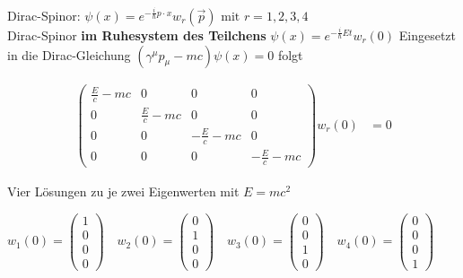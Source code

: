 




{\Huge
Dirac-Spinor: \( \psi(x) = e^{-\frac{i}{\hbar}p\cdot x}w_r(\vec p) \text{ mit }  r=1,2,3,4 \)\\
Dirac-Spinor \textbf{im Ruhesystem des Teilchens} \( \psi(x) = e^{-\frac{i}{\hbar}Et  }w_r(0) \)
Eingesetzt in die Dirac-Gleichung \( \left(\gamma^\mu p_\mu - mc\right)\psi(x) = 0 \) folgt

\begin{align*}
   \begin{pmatrix}
    \frac{E}{c} - mc&0&0&0\\
    0&\frac{E}{c} - mc&0&0\\ 
    0&0&-\frac{E}{c} - mc&0\\
    0&0&0&-\frac{E}{c} - mc
  \end{pmatrix} w_r(0) &=0
\end{align*}

Vier Lösungen zu je zwei Eigenwerten mit \(E=mc^2\)

\(
   w_1(0) =
  \begin{pmatrix}
    1\\0\\0\\0
  \end{pmatrix}\quad  
  w_2(0) =
  \begin{pmatrix}
    0\\1\\0\\0
  \end{pmatrix}\quad  
 w_3(0) =
  \begin{pmatrix}
    0\\0\\1\\0
  \end{pmatrix}\quad  
 w_4(0) =
  \begin{pmatrix}
    0\\0\\0\\1
  \end{pmatrix}
\)


}%

